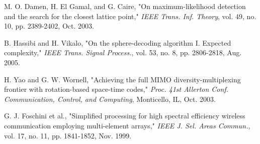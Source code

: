 \begin{thebibliography}{14}
 M. O. Damen, H. El Gamal, and G. Caire, "On maximum-likelihood detection and the search for the closest lattice point," \textit{IEEE Trans. Inf. Theory}, vol. 49, no. 10, pp. 2389-2402, Oct. 2003.

 B. Hassibi and H. Vikalo, "On the sphere-decoding algorithm I. Expected complexity," \textit{IEEE Trans. Signal Process.}, vol. 53, no. 8, pp. 2806-2818, Aug. 2005.

 H. Yao and G. W. Wornell, "Achieving the full MIMO diversity-multiplexing frontier with rotation-based space-time codes," \textit{Proc. 41st Allerton Conf. Communication, Control, and Computing}, Monticello, IL, Oct. 2003.

 G. J. Foschini et al., "Simplified processing for high spectral efficiency wireless communication employing multi-element arrays," \textit{IEEE J. Sel. Areas Commun.}, vol. 17, no. 11, pp. 1841-1852, Nov. 1999.
\end{thebibliography}
